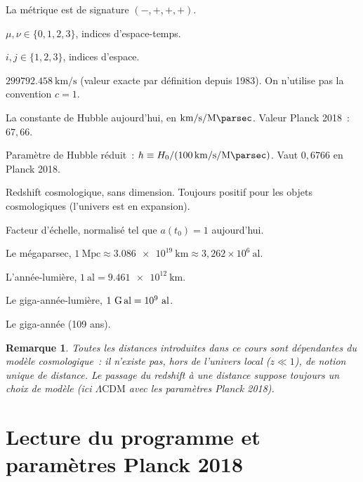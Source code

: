 \documentclass[11pt,a4paper,openany]{report}
\newcommand{\Mpc}{\text{Mpc}}
\newcommand{\Gly}{\text{G\,al}}
\newcommand{\Gyr}{\text{Gyr}}
\newcommand{\al}{\text{al}}
\newcommand{\Hzero}{H_{0}}
\newtheorem{remark}[theorem]{Remarque}
\begin{document}
\begin{description}[leftmargin=2.4cm,labelwidth=2.2cm]
\item[Signature] La métrique est de signature $(-,+,+,+)$.
\item[Indices grecs] $\mu,\nu \in \{0,1,2,3\}$, indices d'espace-temps.
\item[Indices latins] $i,j \in \{1,2,3\}$, indices d'espace.
\item[$c$] $\SI{299792.458}{\km\per\second}$ (valeur exacte par définition
  depuis 1983). On n'utilise pas la convention $c=1$.
\item[$\Hzero$] La constante de Hubble aujourd'hui, en
  $\si{\km\per\second\per\mega\parsec}$. Valeur Planck 2018~: $67{,}66$.
\item[$h$] Paramètre de Hubble réduit~: $h \equiv \Hzero / (\SI{100}{\km\per\second\per\mega\parsec})$.
  Vaut $0{,}6766$ en Planck 2018.
\item[$z$] Redshift cosmologique, sans dimension. Toujours positif pour les
  objets cosmologiques (l'univers est en expansion).
\item[$a(t)$] Facteur d'échelle, normalisé tel que $a(t_0) = 1$ aujourd'hui.
\item[$\Mpc$] Le mégaparsec, $1~\Mpc \approx \SI{3.086e19}{\km}
  \approx 3{,}262 \times 10^{6}~\al$.
\item[$\al$] L'année-lumière, $1~\al = \SI{9.461e12}{\km}$.
\item[$\Gly$] Le giga-année-lumière, $1~\Gly = 10^{9}~\al$.
\item[$\Gyr$] Le giga-année (109 ans).
\end{description}

\begin{remark}
Toutes les distances introduites dans ce cours sont \emph{dépendantes du modèle
cosmologique}~: il n'existe pas, hors de l'univers local ($z\ll 1$), de notion
unique de distance. Le passage du redshift à une distance suppose toujours un
choix de modèle (ici $\Lambda\text{CDM}$ avec les paramètres Planck 2018).
\end{remark}

\clearpage

\part{Lecture du programme et paramètres Planck 2018}
\end{document}
